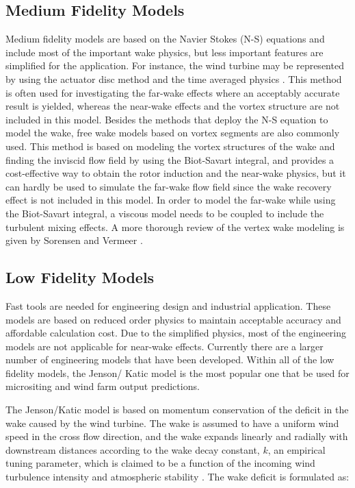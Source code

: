 \documentclass{umthesis}
\begin{document}
\subsection{Medium Fidelity Models}
Medium fidelity models are based on the Navier Stokes (N-S) equations and include most of the important wake physics, but less important features are simplified for the application. For instance, the wind turbine may be represented by using the actuator disc method and the time averaged physics \cite{Mikkelsen_2003}. This method is often used for investigating the far-wake effects where an acceptably accurate result is  yielded, whereas the near-wake effects and the vortex structure are not included in this model. Besides the methods that deploy the N-S equation to model the wake, free wake models based on vortex segments are also commonly used. This method is based on modeling the vortex structures of the wake and finding the inviscid flow field by using the Biot-Savart integral, and provides a cost-effective way to obtain the rotor induction and the near-wake physics, but it can hardly be used to simulate the far-wake flow field since the wake recovery effect is not included in this model. In order to model the far-wake while using the Biot-Savart integral, a viscous model needs to be coupled to include the turbulent mixing effects. A more thorough review of the vertex wake modeling is given by Sorensen\cite{Aerodynamic_aspects} and Vermeer \cite{Vermeer_aerodynamics}.


\subsection{Low Fidelity Models}
Fast tools are needed for engineering design and industrial application. These models are based on reduced order physics to maintain acceptable accuracy and affordable calculation cost. Due to the simplified physics, most of the engineering models are not applicable for near-wake effects. Currently there are a larger number of engineering models that have been developed. Within all of the low fidelity models, the Jenson/ Katic model is the most popular one that be used for micrositing and wind farm output predictions.

The Jenson/Katic model is based on momentum conservation of the deficit in the wake caused by the wind turbine. The wake is assumed to have a uniform wind speed in the cross flow direction, and the wake expands linearly and radially with downstream distances according to the wake decay constant, $k$, an empirical tuning parameter, which is claimed to be a function of the incoming wind turbulence intensity and atmospheric stability \cite{Duckworth_2008}. The wake deficit is formulated as:
\end{document}
